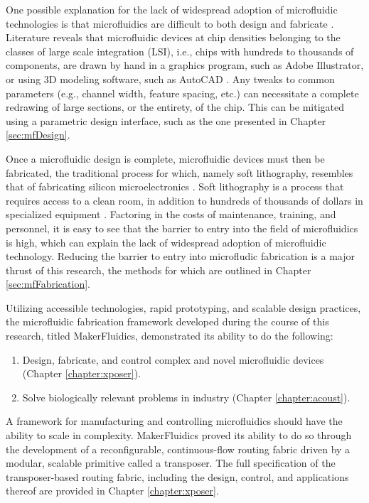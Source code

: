 One possible explanation for the lack of widespread adoption of microfluidic technologies is that microfluidics are difficult to both design and fabricate \cite{whitesides2006}. Literature reveals that microfluidic devices at chip densities belonging to the classes of large scale integration (LSI), i.e., chips with hundreds to thousands of components, are drawn by hand in a graphics program, such as Adobe Illustrator, or using 3D modeling software, such as AutoCAD \cite{araci2014}. Any tweaks to common parameters (e.g., channel width, feature spacing, etc.) can necessitate a complete redrawing of large sections, or the entirety, of the chip. This can be mitigated using a parametric design interface, such as the one presented in Chapter \ref{sec:mfDesign}. 

Once a microfluidic design is complete, microfluidic devices must then be fabricated, the traditional process for which, namely soft lithography, resembles that of fabricating silicon microelectronics \cite{anderson2000fabrication}. Soft lithography is a process that requires access to a clean room, in addition to hundreds of thousands of dollars in specialized equipment \cite{xia1998soft}. Factoring in the costs of maintenance, training, and personnel, it is easy to see that the barrier to entry into the field of microfluidics is high, which can explain the lack of widespread adoption of microfluidic technology. Reducing the barrier to entry into microfludic fabrication is a major thrust of this research, the methods for which are outlined in Chapter \ref{sec:mfFabrication}.

Utilizing accessible technologies, rapid prototyping, and scalable design practices, the microfluidic fabrication framework developed during the course of this research, titled MakerFluidics, demonstrated its ability to do the following:
\begin{enumerate}
	\item Design, fabricate, and control complex and novel microfluidic devices (Chapter \ref{chapter:xposer}).
	\item Solve biologically relevant problems in industry (Chapter \ref{chapter:acoust}).
\end{enumerate}

A framework for manufacturing and controlling microfluidics should have the ability to scale in complexity. MakerFluidics proved its ability to do so through the development of a reconfigurable, continuous-flow routing fabric driven by a modular, scalable primitive called a transposer. The full specification of the transposer-based routing fabric, including the design, control, and applications thereof are provided in Chapter \ref{chapter:xposer}. 

